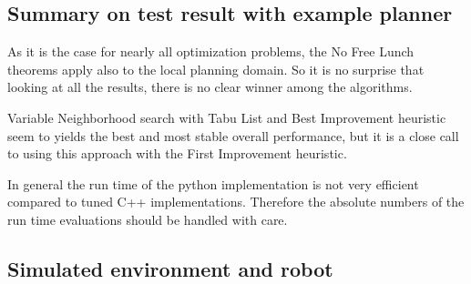 \subsection{Summary on test result with example planner}
As it is the case for nearly all optimization problems, the No Free Lunch theorems \cite{wolpert1997no} apply also to the local planning domain. 
So it is no surprise that looking at all the results, there is no clear winner among the algorithms. 

Variable Neighborhood search with Tabu List and Best Improvement heuristic seem to yields the best and most stable overall performance, but it is a close call to using this approach with the First Improvement heuristic.

In general the run time of the python implementation is not very efficient compared to tuned C++ implementations. 
Therefore the absolute numbers of the run time evaluations should be handled with care.

\subsection{Simulated environment and robot}
